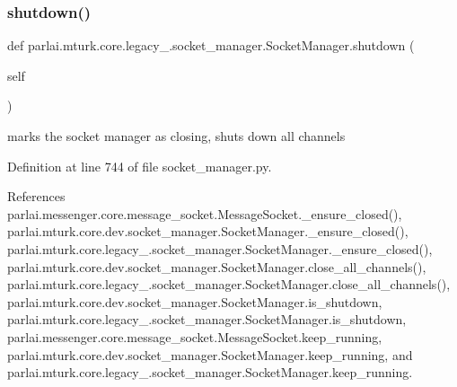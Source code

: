 \subsubsection{\texorpdfstring{shutdown()}{shutdown()}}
{\footnotesize\ttfamily def parlai.\+mturk.\+core.\+legacy\+\_.\+socket\+\_\+manager.\+Socket\+Manager.\+shutdown (\begin{DoxyParamCaption}\item[{}]{self }\end{DoxyParamCaption})}

\begin{DoxyVerb}marks the socket manager as closing, shuts down all channels\end{DoxyVerb}
 

Definition at line 744 of file socket\+\_\+manager.\+py.



References parlai.\+messenger.\+core.\+message\+\_\+socket.\+Message\+Socket.\+\_\+ensure\+\_\+closed(), parlai.\+mturk.\+core.\+dev.\+socket\+\_\+manager.\+Socket\+Manager.\+\_\+ensure\+\_\+closed(), parlai.\+mturk.\+core.\+legacy\+\_.\+socket\+\_\+manager.\+Socket\+Manager.\+\_\+ensure\+\_\+closed(), parlai.\+mturk.\+core.\+dev.\+socket\+\_\+manager.\+Socket\+Manager.\+close\+\_\+all\+\_\+channels(), parlai.\+mturk.\+core.\+legacy\+\_.\+socket\+\_\+manager.\+Socket\+Manager.\+close\+\_\+all\+\_\+channels(), parlai.\+mturk.\+core.\+dev.\+socket\+\_\+manager.\+Socket\+Manager.\+is\+\_\+shutdown, parlai.\+mturk.\+core.\+legacy\+\_.\+socket\+\_\+manager.\+Socket\+Manager.\+is\+\_\+shutdown, parlai.\+messenger.\+core.\+message\+\_\+socket.\+Message\+Socket.\+keep\+\_\+running, parlai.\+mturk.\+core.\+dev.\+socket\+\_\+manager.\+Socket\+Manager.\+keep\+\_\+running, and parlai.\+mturk.\+core.\+legacy\+\_.\+socket\+\_\+manager.\+Socket\+Manager.\+keep\+\_\+running.

